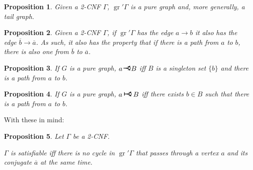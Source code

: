 \documentclass[11pt]{article}
\newcommand{\conj}[1]{\overline{#1}}
\DeclareMathOperator{\gr}{gr}
\newcommand{\rightcurveor}{
\!
\mathrel{
  \begin{tikzpicture}[scale=0.8]
    \draw[thick,->] (0,0) arc (90:150:-2ex);
    \draw[thick,->] (0,0) arc (90:30:2ex);
    \draw[thick] (-1ex, 0) -- (0.1ex,0);
  \end{tikzpicture}
}\!
}
\newcommand{\Rightcurveor}{
\mathrel{
  \begin{tikzpicture}[scale=0.8]
    \draw[thick,->] (0,0) arc (90:150:-2ex);
    \draw[thick,->] (0,0) arc (90:30:2ex);
    \draw[thick] (-1ex, 0) -- (0.1ex,0);
    \draw[thick] (-1ex, -0.7ex) -- (-1ex, 0.7ex);
  \end{tikzpicture}
}
}
\newtheorem{prop}{Proposition}
\begin{document}
\begin{prop}
Given a 2-CNF $\Gamma$, $\gr' \Gamma$ is a pure graph and, more generally, a tail graph.
\end{prop}

\begin{prop}
Given a 2-CNF $\Gamma$, if $\gr' \Gamma$ has the edge $a \rightarrow b$ it also has the edge $\conj b \rightarrow \conj a$. As such, it also has the property that if there is a path from $a$ to $b$, there is also one from $\conj b$ to $\conj a$.
\end{prop}

\begin{prop}
If $G$ is a pure graph, $a \rightcurveor B$ iff $B$ is a singleton set $\{b\}$ and there is a path from $a$ to $b$.
\end{prop}

\begin{prop}
If $G$ is a pure graph, $a \Rightcurveor B$ iff there exists $b \in B$ such that there is a path from $a$ to $b$.
\end{prop}

With these in mind:

\begin{prop}
Let $\Gamma$ be a 2-CNF.

$\Gamma$ is satisfiable iff there is no cycle in $\gr' \Gamma$ that passes through a vertex $a$ and its conjugate $\conj a$ at the same time.
\end{prop}
\end{document}
